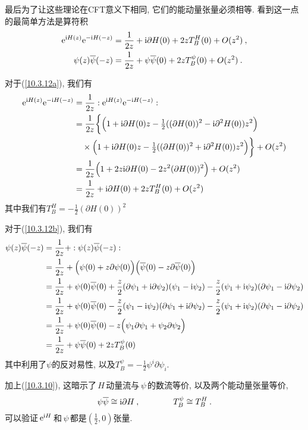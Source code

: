 最后为了让这些理论在CFT意义下相同, 它们的能动量张量必须相等. 看到这一点的最简单方法是算符积
\begin{subequations}
\begin{align}
    \mathrm{e}^{\mathrm{i} H(z)}\mathrm{e}^{-\mathrm{i} H(-z)} &= \frac{1}{2z} + \mathrm{i}\partial H(0)+2zT_{B}^{H}(0)+O(z^{2})\:, \label{10.3.12a} \\
    \psi(z)\overline{\psi}(-z) &= \frac{1}{2z} + \psi\overline{\psi}(0) +2zT_{B}^{\psi}(0) + O(z^{2}) \:. \label{10.3.12b}
\end{align} \label{10.3.12}
\end{subequations}
\begin{tcolorbox}
对于(\ref{10.3.12a}), 我们有
\begin{align*}
    \mathrm{e}^{\mathrm{i} H(z)}\mathrm{e}^{-\mathrm{i} H(-z)} &= \frac{1}{2z} :  \mathrm{e}^{\mathrm{i} H(z)}\mathrm{e}^{-\mathrm{i} H(-z)} : \\
    &= \frac{1}{2z} \biggl\{ \Bigl(1+\mathrm{i}\partial H(0)z-\tfrac{1}{2}((\partial H(0))^{2} -\mathrm{i} \partial^{2} H(0))z^{2}\Bigr)\\
    &\quad\times\Bigl(1+\mathrm{i}\partial H(0)z-\tfrac{1}{2}((\partial H(0))^{2} +\mathrm{i} \partial^{2} H(0))z^{2}\Bigr) \biggr\}
    +O(z^{2}) \\
    & =\frac{1}{2z}\Bigl(1+ 2z\mathrm{i}\partial H(0)-2z^{2}(\partial H(0))^{2}\Bigr)+O(z^{2}) \\
    &=\frac{1}{2z} + \mathrm{i}\partial H(0)+2zT_{B}^{H}(0)+O(z^{2})
\end{align*} 
其中我们有$T_{B}^{H}=-\tfrac{1}{2}(\partial H(0))^{2}$

对于(\ref{10.3.12b}), 我们有
\begin{align*}
    \psi(z)\overline{\psi}(-z) &= \frac{1}{2z} + :\psi(z)\overline{\psi}(-z) : \\
    &= \frac{1}{2z} + \Bigl(\psi(0)+z\partial\psi(0)\Bigr) \Bigl(\overline{\psi}(0)-z\partial\overline{\psi}(0)\Bigr) \\
    &=\frac{1}{2z} +\psi(0)\overline{\psi}(0) +\frac{z}{2}(\partial\psi_{1}+\mathrm{i}\partial\psi_{2})(\psi_{1}-\mathrm{i}\psi_{2})
    -\frac{z}{2}(\psi_{1}+\mathrm{i}\psi_{2})(\partial\psi_{1}-\mathrm{i}\partial\psi_{2})\\
    &=\frac{1}{2z} +\psi(0)\overline{\psi}(0)-\frac{z}{2}(\psi_{1}-\mathrm{i}\psi_{2})(\partial\psi_{1}+\mathrm{i}\partial\psi_{2})
    -\frac{z}{2}(\psi_{1}+\mathrm{i}\psi_{2})(\partial\psi_{1}-\mathrm{i}\partial\psi_{2}) \\
    &= \frac{1}{2z} +\psi(0)\overline{\psi}(0)- z\Bigl(\psi_{1}\partial\psi_{1}+\psi_{2}\partial\psi_{2}\Bigr) \\
    &=\frac{1}{2z} + \psi\overline{\psi}(0) +2zT_{B}^{\psi}(0) 
\end{align*}
其中利用了$\psi$的反对易性, 以及$T_{B}^{\psi}=-\frac{1}{2}\psi^{i}\partial\psi_{i}$.
\end{tcolorbox}
加上(\ref{10.3.10}), 这暗示了$\,H\,$动量流与$\,\psi\,$的数流等价, 以及两个能动量张量等价,
\begin{equation}
    \psi\overline{\psi}\cong \mathrm{i}\partial H\:, \qquad \qquad 
    T_{B}^{\psi}\cong T_{B}^{H} \:. \label{10.3.13}
\end{equation}
可以验证$\,\mathrm{e}^{\mathrm{i} H}\,$和$\,\psi\,$都是$(\frac{1}{2},0)$张量.

